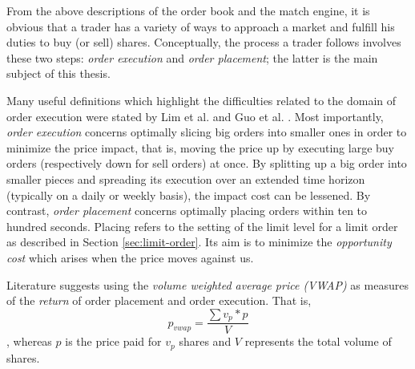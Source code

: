 From the above descriptions of the order book and the match engine, it is obvious that a trader has a variety of ways to approach a market and fulfill his duties to buy (or sell) shares.
Conceptually, the process a trader follows involves these two steps: \textit{order execution} and \textit{order placement}; the latter is the main subject of this thesis.

Many useful definitions which highlight the difficulties related to the domain of order execution were stated by Lim et al. \cite{lim2005optimal} and Guo et al. \cite{guo2013optimal}.
Most importantly, \textit{order execution} concerns optimally slicing big orders into smaller ones in order to minimize the price impact, that is, moving the price up by executing large buy orders (respectively down for sell orders) at once. 
By splitting up a big order into smaller pieces and spreading its execution over an extended time horizon (typically on a daily or weekly basis), the impact cost can be lessened.
By contrast, \textit{order placement} concerns optimally placing orders within ten to hundred seconds.
Placing refers to the setting of the limit level for a limit order as described in Section \ref{sec:limit-order}.
Its aim is to minimize the \textit{opportunity cost} which arises when the price moves against us.

Literature\cite{nevmyvaka2006reinforcement, guo2013optimal} suggests using the \textit{volume weighted average price (VWAP)} as measures of the \textit{return} of order placement and order execution.
That is,
\begin{equation}\label{eq:vwap}
    p_{vwap}=\frac{\sum{v_p*p}}{V}
\end{equation}
, whereas $p$ is the price paid for $v_p$ shares and $V$ represents the total volume of shares.

